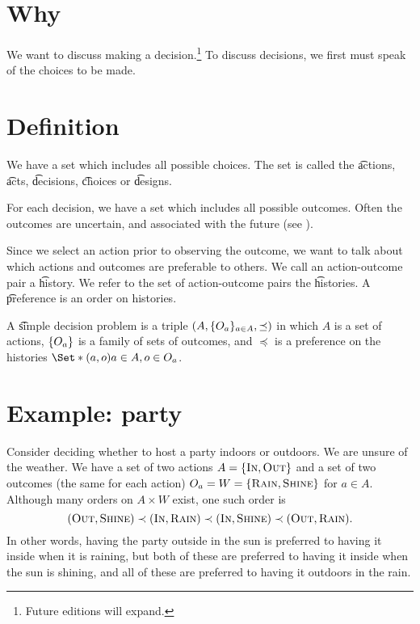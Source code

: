 

\section*{Why}

We want to discuss making a decision.\footnote{Future editions will expand.}
To discuss decisions, we first must speak of the choices to be made.

\section*{Definition}

We have a set which includes all possible choices.
The set is called the \t{actions}, \t{acts}, \t{decisions}, \t{choices} or \t{designs}.

For each decision, we have a set which includes all possible outcomes.
Often the outcomes are uncertain, and associated with the future (see ).

Since we select an action prior to observing the outcome, we want to talk about which actions and outcomes are preferable to others.
We call an action-outcome pair a \t{history}.
We refer to the set of action-outcome pairs the \t{histories}.
A \t{preference} is an order on histories.

A \t{simple decision problem} is a triple $(A, \{O_a\}_{a \in A}, \preceq)$ in which $A$ is a set of actions, $\{O_a\}$ is a family of sets of outcomes, and $\preceq$ is a preference on the histories $\Set*{(a, o)}{a \in A, o \in O_a}$.

\section*{Example: party}

Consider deciding whether to host a party indoors or outdoors.
We are unsure of the weather.
We have a set of two actions $A = \{\textsc{In}, \textsc{Out}\}$ and a set of two outcomes (the same for each action) $O_a = W = \{\textsc{Rain}, \textsc{Shine}\}$ for $a \in A$.
Although many orders on $A \times  W$ exist, one such order is
    \[
(\textsc{Out}, \textsc{Shine}) \prec (\textsc{In}, \textsc{Rain}) \prec (\textsc{In}, \textsc{Shine}) \prec (\textsc{Out}, \textsc{Rain}).
    \]
In other words, having the party outside in the sun is preferred to having it inside when it is raining, but both of these are preferred to having it inside when the sun is shining, and all of these are preferred to having it outdoors in the rain.

